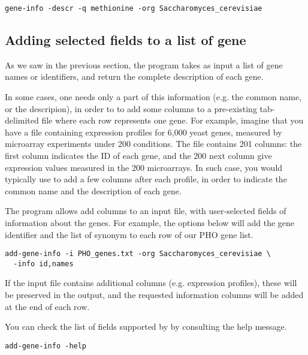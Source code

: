 {\color{Blue} \begin{footnotesize}
\begin{verbatim}
gene-info -descr -q methionine -org Saccharomyces_cerevisiae
\end{verbatim} \end{footnotesize}
}

\subsection{Adding selected fields to a list of gene}

As we saw in the previous section, the program 
takes as input a list of gene names or identifiers, and return the
complete description of each gene.

In some cases, one needs only a part of this information (e.g. the
common name, or the descripion), in order to to add some columns to a
pre-existing tab-delimited file where each row represents one
gene. For example, imagine that you have a file containing expression
profiles for 6,000 yeast genes, measured by microarray experiments
under 200 conditions. The file contains 201 columns: the first column
indicates the ID of each gene, and the 200 next column give expression
values measured in the 200 microarrays. In such case, you would
typically use  to add a few columns after each
profile, in order to indicate the common name and the description of
each gene.

The program  allows add columns to an input
file, with user-selected fields of information about the genes. For
example, the options below will add the gene identifier and the list
of synonym to each row of our PHO gene list. 

{\color{Blue} \begin{footnotesize}
\begin{verbatim}
add-gene-info -i PHO_genes.txt -org Saccharomyces_cerevisiae \
  -info id,names
\end{verbatim} \end{footnotesize}
}

If the input file contains additional columns (e.g. expression
profiles), these will be preserved in the output, and the requested
information columns will be added at the end of each row.

You can check the list of fields supported by 
by consulting the help message.

{\color{Blue} \begin{footnotesize}
\begin{verbatim}
add-gene-info -help
\end{verbatim} \end{footnotesize}
}


